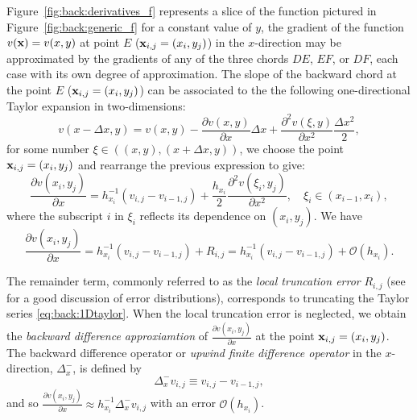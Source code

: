 Figure~\ref{fig:back:derivatives_f} represents a slice
of the function pictured in Figure~\ref{fig:back:generic_f} for a constant
value of $y$, the gradient of the function $v(\mathbf{x})=v(x,y)$ at point $E$
($\mathbf{x}_{i,j}=(x_i,y_j)$) in the $x$-direction may be  approximated by the
gradients of any of the three chords $DE$, $EF$, or $DF$, each  case with its own degree of approximation. The slope of the backward chord at the point $E$
($\mathbf{x}_{i,j}=(x_i,y_j)$) can be associated to the the following one-directional
Taylor expansion in two-dimensions:
%
\begin{equation}\label{eq:back:1Dtaylor}
v(x-\Delta x,y)=v(x,y)-\frac{\partial v(x,y)}{\partial x}\Delta x + \frac{\partial^2 v(\xi,y)}{\partial x^2}\frac{\Delta x^2}{2},
\end{equation}
%
for some number $\xi\in\left((x,y),(x+\Delta x,y)\right)$, we choose the point
$\mathbf{x}_{i,j}=(x_i,y_j)$ and
rearrange the previous expression to give:
$$
\frac{\partial v(x_i,y_j)}{\partial x} = h_{x_i}^{-1}(v_{i,j}-v_{i-1,j}) + \frac{h_{x_i}}{2}\frac{\partial^2 v(\xi_i,y_j)}{\partial x^2}, \quad \xi_i\in(x_{i-1},x_{i}),
$$
where the subscript $i$ in $\xi_i$ reflects its dependence on $(x_i,y_j)$.
We have
$$
\frac{\partial v(x_i,y_j)}{\partial x} = h_{x_i}^{-1}(v_{i,j}-v_{i-1,j})+R_{i,j} = h_{x_i}^{-1}(v_{i,j}-v_{i-1,j}) + \mathscr{O}(h_{x_i}).
$$

The remainder term, commonly referred to as the \emph{local truncation error}
$R_{i,j}$ (see~\cite{PapLieStr14} for a good discussion of error
distributions), corresponds to truncating the Taylor series
\eqref{eq:back:1Dtaylor}. When the local truncation error is neglected, we obtain the \emph{backward difference approxiamtion} of
$\frac{\partial v(x_i,y_j)}{\partial x}$ at the point $\mathbf{x}_{i,j}=(x_i,y_j)$.
The backward difference operator or \emph{upwind finite difference operator}
in the $x$-direction, $\Delta^{-}_{x}$, is defined by
%
\begin{equation}\label{eq:back:1DupwindOp}
\Delta^{-}_{x}v_{i,j}\equiv v_{i,j}-v_{i-1,j},
\end{equation}
%
and so $\frac{\partial v(x_i,y_j)}{\partial x} \approx h_{x_i}^{-1}
\Delta^{-}_{x}v_{i,j}$ with an error $\mathscr{O}(h_{x_i})$.

